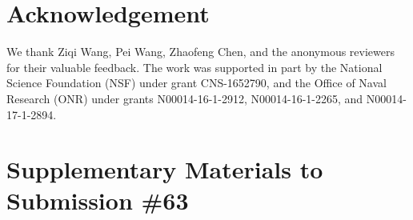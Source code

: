 \documentclass[10pt,conference]{IEEEtran}
\begin{document}
\section{Acknowledgement}
We thank Ziqi Wang, Pei Wang, Zhaofeng Chen, and the anonymous reviewers for their valuable feedback. The work was supported in part by the National Science Foundation (NSF) under grant CNS-1652790, and the Office of Naval Research (ONR) under grants N00014-16-1-2912, N00014-16-1-2265, and N00014-17-1-2894.
\newpage




\newpage
\clearpage
\setcounter{section}{0}
\section*{Supplementary Materials to Submission \#63}
\setcounter{page}{1}

\end{document}
